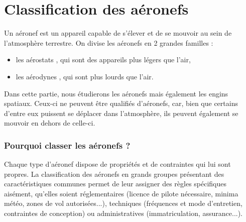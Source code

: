 
\section{Classification des aéronefs}
Un \gls{aéronef}  est un appareil capable de s'élever et de se mouvoir au sein de l'atmosphère terrestre. On divise les aéronefs en 2 grandes familles :
\begin{itemize}
	\item les  \gls{aérostat}s , qui sont des appareils plus légers que l'air,
	\item les  \gls{aérodyne}s , qui sont plus lourds que l'air.
\end{itemize}

Dans cette partie, nous étudierons les aéronefs mais également les engins spatiaux. Ceux-ci ne peuvent être qualifiés d'aéronefs, car, bien que certains d'entre eux puissent se déplacer dans l'atmosphère, ils peuvent également se mouvoir en dehors de celle-ci.

\subsubsection{Pourquoi classer les aéronefs ?}
Chaque type d'aéronef dispose de propriétés et de contraintes qui lui sont propres. La classification des aéronefs en grands groupes présentant des caractéristiques communes permet de leur assigner des règles spécifiques aisément, qu'elles soient réglementaires (licence de pilote nécessaire, minima météo, zones de vol autorisées...), techniques (fréquences et mode d'entretien, contraintes de conception) ou administratives (immatriculation, assurance...).

